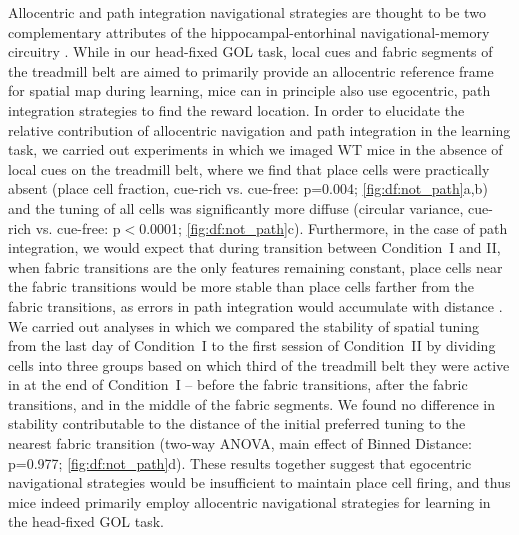Allocentric and path integration navigational strategies are thought to be two complementary attributes of the hippocampal-entorhinal navigational-memory circuitry \citep{Buzsaki2013, Etienne2004, Gothard1996, Moser2015}. While in our head-fixed GOL task, local cues and fabric segments of the treadmill belt are aimed to primarily provide an allocentric reference frame for spatial map during learning, mice can in principle also use egocentric, path integration strategies to find the reward location. In order to elucidate the relative contribution of allocentric navigation and path integration in the learning task, we carried out experiments in which we imaged WT mice in the absence of local cues on the treadmill belt, where we find that place cells were practically absent (place cell fraction, cue-rich vs. cue-free: p=0.004; \autoref{fig:df:not_path}a,b) and the tuning of all cells was significantly more diffuse (circular variance, cue-rich vs. cue-free: p$<$0.0001; \autoref{fig:df:not_path}c). Furthermore, in the case of path integration, we would expect that during transition between Condition~I and II, when fabric transitions are the only features remaining constant, place cells near the fabric transitions would be more stable than place cells farther from the fabric transitions, as errors in path integration would accumulate with distance \citep{Etienne2004, Gothard1996}. We carried out analyses in which we compared the stability of spatial tuning from the last day of Condition~I to the first session of Condition~II by dividing cells into three groups based on which third of the treadmill belt they were active in at the end of Condition~I -- before the fabric transitions, after the fabric transitions, and in the middle of the fabric segments. We found no difference in stability contributable to the distance of the initial preferred tuning to the nearest fabric transition (two-way ANOVA, main effect of Binned Distance: p=0.977; \autoref{fig:df:not_path}d). These results together suggest that egocentric navigational strategies would be insufficient to maintain place cell firing, and thus mice indeed primarily employ allocentric navigational strategies for learning in the head-fixed GOL task.

